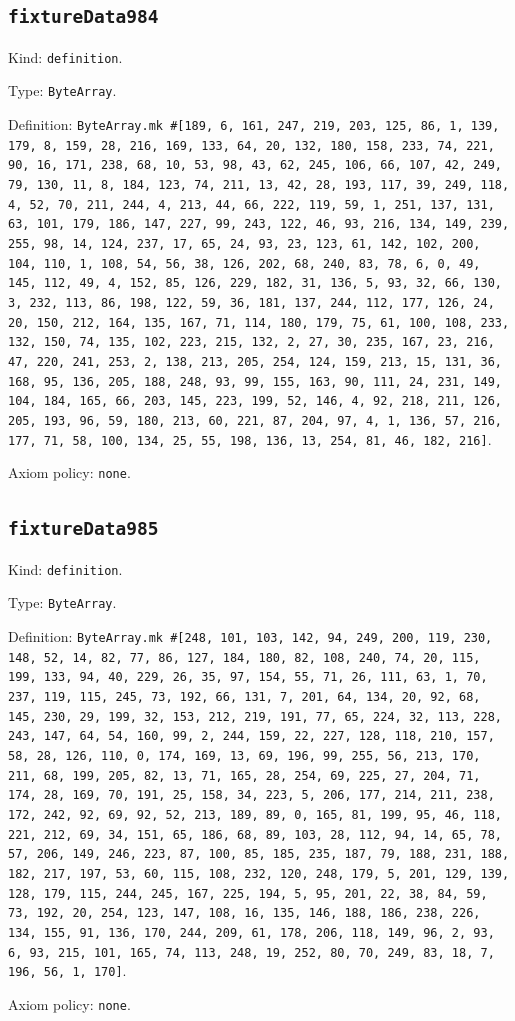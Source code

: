 \documentclass[11pt]{article}
\begin{document}
\subsection*{\texttt{fixtureData984}}
\noindent Kind: \texttt{definition}.\par
\noindent Type: \texttt{ByteArray}.\par
\noindent Definition: \texttt{ByteArray.mk \#[189, 6, 161, 247, 219, 203, 125, 86, 1, 139, 179, 8, 159, 28, 216, 169, 133, 64, 20, 132, 180, 158, 233, 74, 221, 90, 16, 171, 238, 68, 10, 53, 98, 43, 62, 245, 106, 66, 107, 42, 249, 79, 130, 11, 8, 184, 123, 74, 211, 13, 42, 28, 193, 117, 39, 249, 118, 4, 52, 70, 211, 244, 4, 213, 44, 66, 222, 119, 59, 1, 251, 137, 131, 63, 101, 179, 186, 147, 227, 99, 243, 122, 46, 93, 216, 134, 149, 239, 255, 98, 14, 124, 237, 17, 65, 24, 93, 23, 123, 61, 142, 102, 200, 104, 110, 1, 108, 54, 56, 38, 126, 202, 68, 240, 83, 78, 6, 0, 49, 145, 112, 49, 4, 152, 85, 126, 229, 182, 31, 136, 5, 93, 32, 66, 130, 3, 232, 113, 86, 198, 122, 59, 36, 181, 137, 244, 112, 177, 126, 24, 20, 150, 212, 164, 135, 167, 71, 114, 180, 179, 75, 61, 100, 108, 233, 132, 150, 74, 135, 102, 223, 215, 132, 2, 27, 30, 235, 167, 23, 216, 47, 220, 241, 253, 2, 138, 213, 205, 254, 124, 159, 213, 15, 131, 36, 168, 95, 136, 205, 188, 248, 93, 99, 155, 163, 90, 111, 24, 231, 149, 104, 184, 165, 66, 203, 145, 223, 199, 52, 146, 4, 92, 218, 211, 126, 205, 193, 96, 59, 180, 213, 60, 221, 87, 204, 97, 4, 1, 136, 57, 216, 177, 71, 58, 100, 134, 25, 55, 198, 136, 13, 254, 81, 46, 182, 216]}.\par
\noindent Axiom policy: \texttt{none}.\par
\subsection*{\texttt{fixtureData985}}
\noindent Kind: \texttt{definition}.\par
\noindent Type: \texttt{ByteArray}.\par
\noindent Definition: \texttt{ByteArray.mk \#[248, 101, 103, 142, 94, 249, 200, 119, 230, 148, 52, 14, 82, 77, 86, 127, 184, 180, 82, 108, 240, 74, 20, 115, 199, 133, 94, 40, 229, 26, 35, 97, 154, 55, 71, 26, 111, 63, 1, 70, 237, 119, 115, 245, 73, 192, 66, 131, 7, 201, 64, 134, 20, 92, 68, 145, 230, 29, 199, 32, 153, 212, 219, 191, 77, 65, 224, 32, 113, 228, 243, 147, 64, 54, 160, 99, 2, 244, 159, 22, 227, 128, 118, 210, 157, 58, 28, 126, 110, 0, 174, 169, 13, 69, 196, 99, 255, 56, 213, 170, 211, 68, 199, 205, 82, 13, 71, 165, 28, 254, 69, 225, 27, 204, 71, 174, 28, 169, 70, 191, 25, 158, 34, 223, 5, 206, 177, 214, 211, 238, 172, 242, 92, 69, 92, 52, 213, 189, 89, 0, 165, 81, 199, 95, 46, 118, 221, 212, 69, 34, 151, 65, 186, 68, 89, 103, 28, 112, 94, 14, 65, 78, 57, 206, 149, 246, 223, 87, 100, 85, 185, 235, 187, 79, 188, 231, 188, 182, 217, 197, 53, 60, 115, 108, 232, 120, 248, 179, 5, 201, 129, 139, 128, 179, 115, 244, 245, 167, 225, 194, 5, 95, 201, 22, 38, 84, 59, 73, 192, 20, 254, 123, 147, 108, 16, 135, 146, 188, 186, 238, 226, 134, 155, 91, 136, 170, 244, 209, 61, 178, 206, 118, 149, 96, 2, 93, 6, 93, 215, 101, 165, 74, 113, 248, 19, 252, 80, 70, 249, 83, 18, 7, 196, 56, 1, 170]}.\par
\noindent Axiom policy: \texttt{none}.\par
\end{document}

